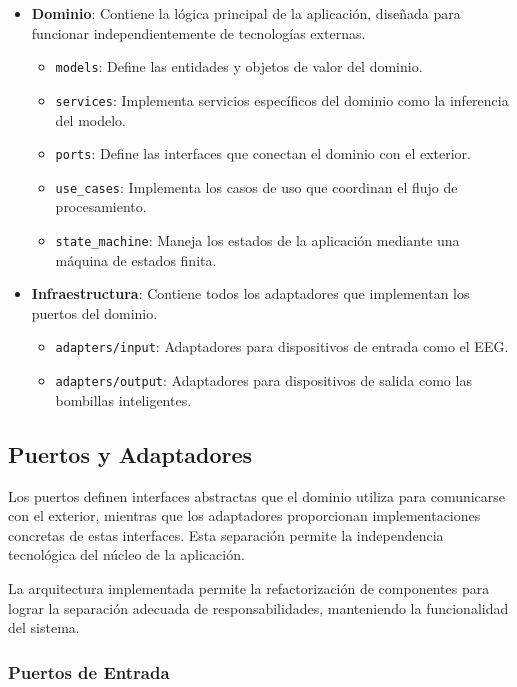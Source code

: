 \begin{itemize}
    \item \textbf{Dominio}: Contiene la lógica principal de la aplicación, diseñada para funcionar independientemente de tecnologías externas.
    \begin{itemize}
        \item \texttt{models}: Define las entidades y objetos de valor del dominio.
        \item \texttt{services}: Implementa servicios específicos del dominio como la inferencia del modelo.
        \item \texttt{ports}: Define las interfaces que conectan el dominio con el exterior.
        \item \texttt{use\_cases}: Implementa los casos de uso que coordinan el flujo de procesamiento.
        \item \texttt{state\_machine}: Maneja los estados de la aplicación mediante una máquina de estados finita.
    \end{itemize}
    
    \item \textbf{Infraestructura}: Contiene todos los adaptadores que implementan los puertos del dominio.
    \begin{itemize}
        \item \texttt{adapters/input}: Adaptadores para dispositivos de entrada como el EEG.
        \item \texttt{adapters/output}: Adaptadores para dispositivos de salida como las bombillas inteligentes.
    \end{itemize}
\end{itemize}

\subsection{Puertos y Adaptadores}

Los puertos definen interfaces abstractas que el dominio utiliza para comunicarse con el exterior, mientras que los adaptadores proporcionan implementaciones concretas de estas interfaces. Esta separación permite la independencia tecnológica del núcleo de la aplicación.

La arquitectura implementada permite la refactorización de componentes para lograr la separación adecuada de responsabilidades, manteniendo la funcionalidad del sistema.

\subsubsection{Puertos de Entrada}

